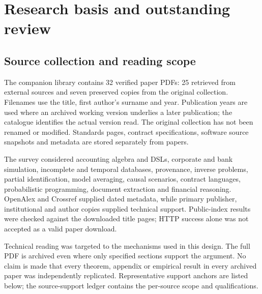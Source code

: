 \chapter{Research basis and outstanding review}
\label{app:research}

\section{Source collection and reading scope}

The companion library contains 32 verified paper PDFs: 25 retrieved from
external sources and seven preserved copies from the original collection.
Filenames use the title, first author's surname and year. Publication years
are used where an archived working version underlies a later publication;
the catalogue identifies the actual version read. The original collection
has not been renamed or modified. Standards pages, contract specifications,
software source snapshots and metadata are stored separately from papers.

The survey considered accounting algebra and DSLs, corporate and bank
simulation, incomplete and temporal databases, provenance, inverse problems,
partial identification, model averaging, causal scenarios, contract languages,
probabilistic programming, document extraction and financial reasoning.
OpenAlex and Crossref supplied dated metadata, while primary publisher,
institutional and author copies supplied technical support. Public-index
results were checked against the downloaded title pages; HTTP success alone
was not accepted as a valid paper download.

Technical reading was targeted to the mechanisms used in this design.
The full PDF is archived even where only specified sections support the
argument. No claim is made that every theorem, appendix or empirical result
in every archived paper was independently replicated. Representative support
anchors are listed below; the source-support ledger contains the per-source
scope and qualifications.

